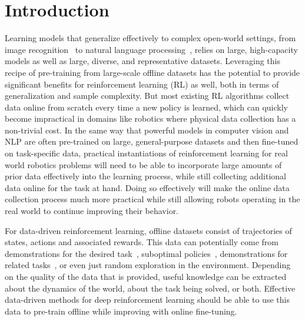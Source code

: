 \section{Introduction}\label{sec:introduction}
Learning models that generalize effectively to complex open-world settings, from image recognition~\citep{krizhevsky2012imagenet} to natural language processing~\citep{devlin2019bert}, relies on large, high-capacity models as well as large, diverse, and representative datasets.
Leveraging this recipe of pre-training from large-scale offline datasets has the potential to provide significant benefits for reinforcement learning (RL) as well, both in terms of generalization and sample complexity.
But most existing RL algorithms collect data online from scratch every time a new policy is learned, which can quickly become impractical in domains like robotics where physical data collection has a non-trivial cost. 
In the same way that powerful models in computer vision and NLP are often pre-trained on large, general-purpose datasets and then fine-tuned on task-specific data, practical instantiations of reinforcement learning for real world robotics problems will need to be able to incorporate large amounts of prior data effectively into the learning process, while still collecting additional data online for the task at hand. 
Doing so effectively will make the online data collection process much more practical while still allowing robots operating in the real world to continue improving their behavior. 

For data-driven reinforcement learning, offline datasets consist of trajectories of states, actions and associated rewards. This data can potentially come from demonstrations for the desired task~\citep{schaal97lfd, atkeson1997lfd}, suboptimal policies~\citep{gao2018imperfect}, demonstrations for related tasks~\citep{zhou2019wtl}, or even just random exploration in the environment. Depending on the quality of the data that is provided, useful knowledge can be extracted about the dynamics of the world, about the task being solved, or both. Effective data-driven methods for deep reinforcement learning should be able to use this data to pre-train offline while improving with online fine-tuning. 



